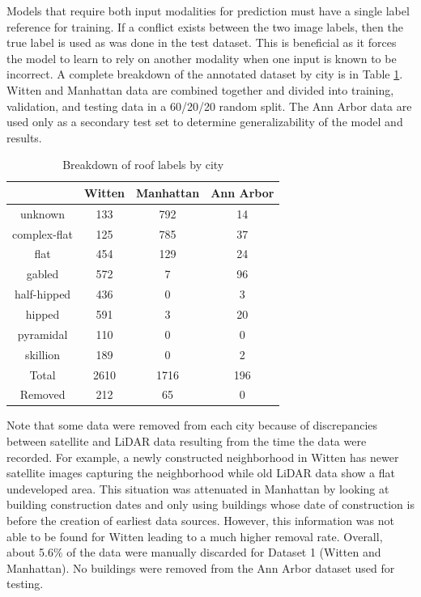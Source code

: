 Models that require both input modalities for prediction must have a single label reference for training. If a conflict exists between the two image labels, then the true label is used as was done in the test dataset.  This is beneficial as it forces the model to learn to rely on another modality when one input is known to be incorrect. A complete breakdown of the annotated dataset by city is in Table \ref{table:city_roofs}.  Witten and Manhattan data are combined together and divided into training, validation, and testing data in a 60/20/20 random split. The Ann Arbor data are used only as a secondary test set to determine generalizability of the model and results.


\begin{table}[ht]
\centering
\caption{Breakdown of roof labels by city}\label{table:city_roofs}
\begin{tabular}{c@{\qquad}cc@{\qquad}c}
\toprule
\multirow{1}{*}{\raisebox{-\heavyrulewidth}{\textbf{Roof Shape}}} &
           \textbf{Witten }& \textbf{Manhattan} & \textbf{Ann Arbor} \\ \midrule
unknown              & 133    & 792      & 14        \\
complex-flat         & 125    & 785      & 37        \\
flat                 & 454    & 129      & 24        \\
gabled               & 572    & 7        & 96        \\
half-hipped          & 436    & 0        & 3         \\
hipped               & 591    & 3        & 20        \\
pyramidal            & 110    & 0        & 0         \\
skillion             & 189    & 0        & 2         \\
\midrule
Total       & 2610   & 1716     & 196       \\ 
Removed              & 212    & 65       & 0         \\
\bottomrule
\end{tabular}
\end{table}


Note that some data were removed from each city because of discrepancies between satellite and LiDAR data resulting from the time the data were recorded. For example, a newly constructed neighborhood in Witten has newer satellite images capturing the neighborhood while old LiDAR data show  a flat undeveloped area. This situation was attenuated in Manhattan by looking at building construction dates and only using buildings whose date of construction is before the creation of earliest data sources. However, this information was not able to be found for Witten leading to a much higher removal rate. Overall, about 5.6\% of the data were manually discarded for Dataset 1 (Witten and Manhattan).  No buildings were removed from the Ann Arbor dataset used for testing.

